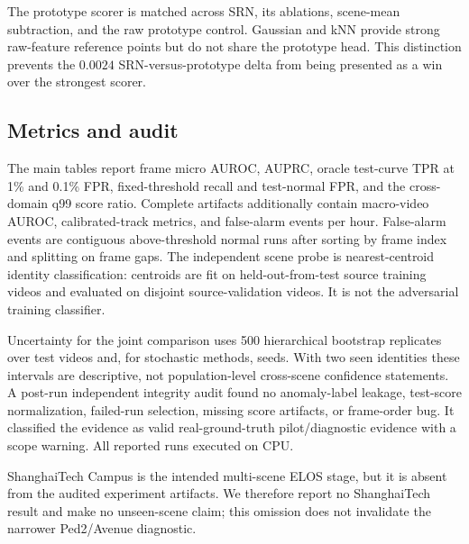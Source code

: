 The prototype scorer is matched across SRN, its ablations, scene-mean subtraction, and the raw prototype control. Gaussian and kNN provide strong raw-feature reference points but do not share the prototype head. This distinction prevents the $0.0024$ SRN-versus-prototype delta from being presented as a win over the strongest scorer.

\subsection{Metrics and audit}

The main tables report frame micro AUROC, AUPRC, oracle test-curve TPR at 1\% and 0.1\% FPR, fixed-threshold recall and test-normal FPR, and the cross-domain q99 score ratio. Complete artifacts additionally contain macro-video AUROC, calibrated-track metrics, and false-alarm events per hour. False-alarm events are contiguous above-threshold normal runs after sorting by frame index and splitting on frame gaps. The independent scene probe is nearest-centroid identity classification: centroids are fit on held-out-from-test source training videos and evaluated on disjoint source-validation videos. It is not the adversarial training classifier.

Uncertainty for the joint comparison uses 500 hierarchical bootstrap replicates over test videos and, for stochastic methods, seeds. With two seen identities these intervals are descriptive, not population-level cross-scene confidence statements. A post-run independent integrity audit found no anomaly-label leakage, test-score normalization, failed-run selection, missing score artifacts, or frame-order bug. It classified the evidence as valid real-ground-truth pilot/diagnostic evidence with a scope warning. All reported runs executed on CPU.

ShanghaiTech Campus is the intended multi-scene ELOS stage, but it is absent from the audited experiment artifacts. We therefore report no ShanghaiTech result and make no unseen-scene claim; this omission does not invalidate the narrower Ped2/Avenue diagnostic.
